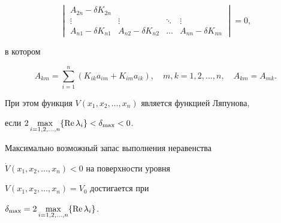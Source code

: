 \begin{thm}
\begin{equation}
\begin{vmatrix}
A_{2n}-\delta K_{2n} \\


\vdots  &  \vdots  & \ddots &  \vdots \\


A_{n1}-\delta K_{n1} & A_{n2}-\delta K_{n2} & \dotsc &


A_{nn}-\delta K_{nn}


\end{vmatrix}


=0,


\end{equation}


в котором


\begin{equation}


A_{km}=\sum_{i=1}^{n} (K_{ik}a_{im}+K_{im}a_{ik}),\quad m,k=1,2,\dotsc,n,


\quad A_{km}=A_{mk}.


\end{equation}


При этом функция $V(x_{1},x_{2},\dotsc,x_{n})$ является функцией Ляпунова,


если $2\max\limits_{i=1,2,\dotsc,n} \{ \operatorname{Re} \lambda_{i} \} <\delta_{\max} <0$.


Максимально возможный запас выполнения неравенства


$\Dot V(x_{1},x_{2},\dotsc,x_{n})<0$ на поверхности уровня


$V(x_{1},x_{2},\dotsc,x_{n})=V_{0}$ достигается при


$\delta_{\max}=2\max\limits_{i=1,2,\dotsc,n} \{ \operatorname{Re} \lambda_{i} \}$.


\end{thm}






